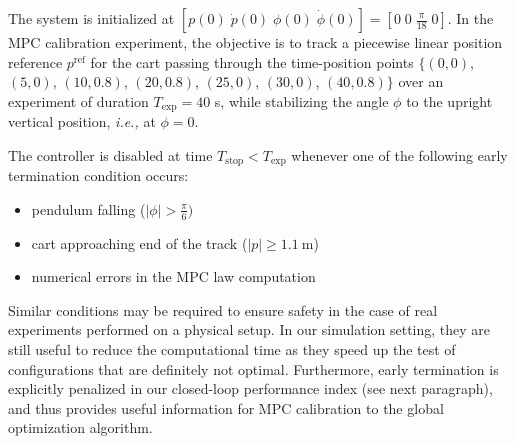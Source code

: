 \documentclass{article}
\newcommand{\Texp}{T_{\mathrm{exp}}}
\newcommand{\Tstop}{T_{\mathrm{stop}}}
\begin{document}
The system is initialized at $[p(0) \;  \dot{p}(0)\; \phi(0)\;\dot{\phi}(0)] = [0 \;  0\; \frac{\pi}{18}\;0]$. In the MPC calibration experiment, the objective is to track a piecewise linear position reference $p^{\mathrm{ref}}$ for the cart passing through the time-position points $\{(0,0)$, $(5,0)$, $(10,0.8)$, $(20,0.8)$, $(25,0)$, $(30,0)$, $(40,0.8)\}$ over an experiment of duration $\Texp=40$ s, while stabilizing the angle $\phi$ to the upright vertical position, \emph{i.e.,} at $\phi=0$. 


The controller is disabled at time $\Tstop < \Texp$ whenever one of the following early termination condition occurs: 
\begin{itemize}
\item pendulum falling ($|\phi| > \frac{\pi}{6})$
\item cart approaching end of the track ($|p| \geq 1.1~\mathrm{m}$)
\item numerical errors in the MPC law computation
\end{itemize}
Similar conditions may be required to ensure safety in the case of real experiments performed on a physical setup. 
In our simulation setting, they are still useful to reduce the computational time as they speed up the test of configurations that are definitely not optimal. 
Furthermore, early termination is explicitly penalized in our closed-loop performance index (see next paragraph), and thus provides useful information for MPC calibration to the global optimization algorithm.
\end{document}
